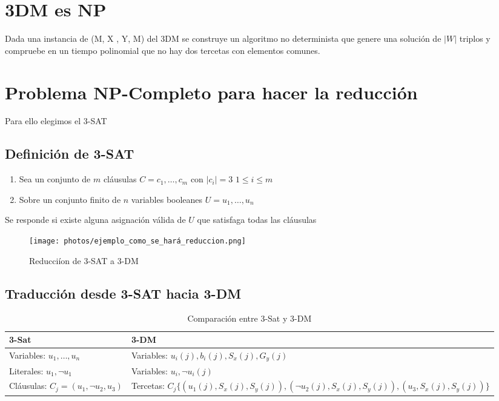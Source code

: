 \documentclass{article}
\begin{document}
\section{3DM es NP}
Dada una instancia de (M, X , Y, M) del 3DM se construye un algoritmo no determinista que genere una solución de 
$|W|$ triplos y compruebe en un  tiempo polinomial que no hay dos tercetas con elementos comunes.

\section{Problema NP-Completo para hacer la reducción}
Para ello elegimos el 3-SAT
\subsection{Definición de 3-SAT}
\begin{enumerate}
    \item Sea un conjunto de $m$ cláusulas $C={c_1, \dots , c_m}$ con $|c_i|=3$ $1 \leq i \leq m$
    \item Sobre un conjunto finito de $n$ variables booleanes $U={u_1, \dots, u_n}$
    
\end{enumerate}
Se responde si existe alguna asignación válida de $U$ que satisfaga todas las cláusulas

\begin{figure}[H]
    \centering
    \texttt{[image: photos/ejemplo\_como\_se\_hará\_reduccion.png]}
    \caption{Reducciíon de 3-SAT a 3-DM}
    \label{fig:etiqueta}
\end{figure}

\subsection{Traducción desde 3-SAT hacia 3-DM}

\begin{table}[h!]
    \centering
    \begin{tabularx}{\textwidth}{|X|X|}
        \hline
        \textbf{3-Sat} & \textbf{3-DM} \\
        \hline
        Variables: $u_1, \ldots, u_n$ & Variables: $u_i(j), b_i(j), S_x(j), G_y(j)$ \\
        \hline
        Literales: $u_1, \lnot u_1$ & Variables: $u_i, \lnot u_{i}(j)$ \\
        \hline
        Cláusulas: $C_{j}=(u_1,\lnot u_2,u_3)$ & Tercetas: $C_{j}\{\left(u_1(j), S_{x}(j), S_{y}(j)\right), \left(\lnot u_2(j), S_{x}(j), S_{y}(j)\right), \left(u_3, S_{x}(j), S_{y}(j)\right)\}$ \\
        \hline
    \end{tabularx}
    \caption{Comparación entre 3-Sat y 3-DM}
\end{table}
\end{document}
